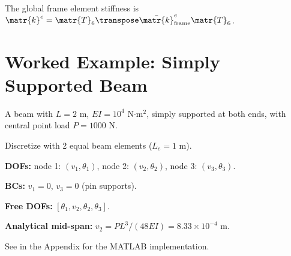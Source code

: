 The global frame element stiffness is $\matr{k}^e = \matr{T}_6\transpose
\bar{\matr{k}}^e_{\text{frame}} \matr{T}_6$.

\section{Worked Example: Simply Supported Beam}

\begin{example}
\label{ex:beam2}

A beam with $L = 2$ m, $EI = 10^4$ N$\cdot$m$^2$, simply supported at
both ends, with central point load $P = 1000$ N.

\medskip
\noindent Discretize with 2 equal beam elements ($L_e = 1$ m).
\medskip

\noindent\textbf{DOFs:} node 1: $(v_1, \theta_1)$, node 2: $(v_2, \theta_2)$,
node 3: $(v_3, \theta_3)$.

\noindent\textbf{BCs:} $v_1 = 0$, $v_3 = 0$ (pin supports).

\noindent\textbf{Free DOFs:} $[\theta_1, v_2, \theta_2, \theta_3]$.

\noindent\textbf{Analytical mid-span:} $v_2 = PL^3/(48EI) = 8.33 \times 10^{-4}$ m.

\noindent See  in the Appendix for the MATLAB implementation.
\end{example}

